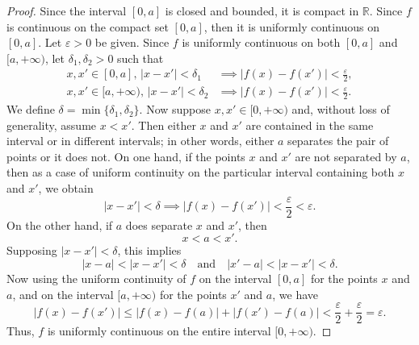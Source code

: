 \documentclass[12pt]{article}
\newcommand{\isp}[1]{\quad\text{#1}\quad}
\newcommand{\R}{\mathbb{R}}
\newcommand{\eps}{\varepsilon}
\begin{document}
\begin{proof}
    Since the interval $[0, a]$ is closed and bounded, it is compact in $\R$. Since $f$ is continuous on the compact set $[0, a]$, then it is uniformly continuous on $[0, a]$. Let $\eps > 0$ be given. Since $f$ is uniformly continuous on both $[0, a]$ and $[a, +\infty)$, let $\delta_1, \delta_2 > 0$ such that
    \begin{align*}
        x, x' \in [0, a],\, |x - x'| < \delta_1 &\implies |f(x) - f(x')| < \frac\eps2, \\[1em]
        x, x' \in [a, +\infty),\, |x - x'| < \delta_2 &\implies |f(x) - f(x')| < \frac\eps2.
    \end{align*}
    We define $\delta = \min\{\delta_1, \delta_2\}$. Now suppose $x, x' \in [0, +\infty)$ and, without loss of generality, assume $x < x'$. Then either $x$ and $x'$ are contained in the same interval or in different intervals; in other words, either $a$ separates the pair of points or it does not. On one hand, if the points $x$ and $x'$ are not separated by $a$, then as a case of uniform continuity on the particular interval containing both $x$ and $x'$, we obtain
    \[
        |x - x'| < \delta \implies |f(x) - f(x')| < \frac\eps2 < \eps.
    \]
    On the other hand, if $a$ does separate $x$ and $x'$, then
    \[
        x < a < x'.
    \]
    Supposing $|x - x'| < \delta$, this implies
    \[
        |x - a| < |x - x'| < \delta \isp{and} |x' - a| < |x - x'| < \delta.
    \]
    Now using the uniform continuity of $f$ on the interval $[0,a]$ for the points $x$ and $a$, and on the interval $[a, +\infty)$ for the points $x'$ and $a$, we have
    \[
        |f(x) - f(x')| \leq |f(x) - f(a)| + |f(x') - f(a)| < \frac\eps2 + \frac\eps2 = \eps.
    \]
    Thus, $f$ is uniformly continuous on the entire interval $[0, +\infty)$.
    
\end{proof}
\end{document}
